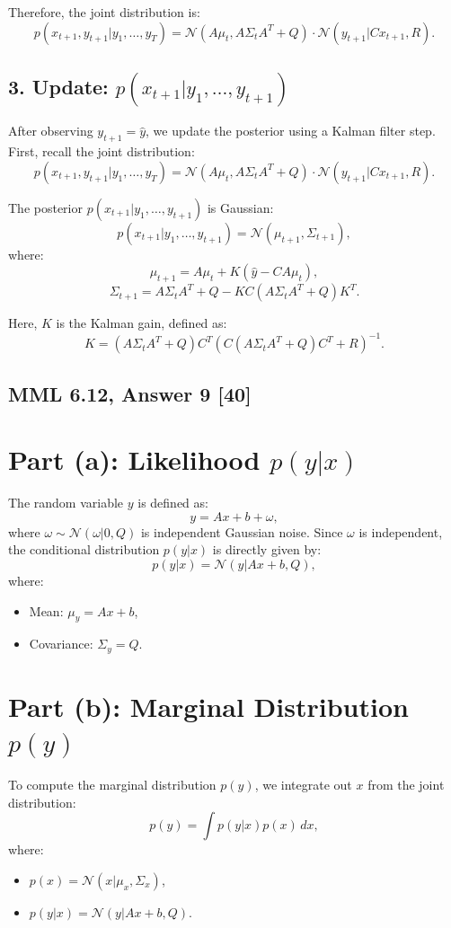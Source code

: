 \documentclass[12pt]{article}
\begin{document}
Therefore, the joint distribution is:
\[
p(x_{t+1}, y_{t+1} | y_1, \dots, y_T) = \mathcal{N}(A \mu_t, A \Sigma_t A^T + Q) \cdot \mathcal{N}(y_{t+1} | C x_{t+1}, R).
\]

\subsection*{3. Update: \( p(x_{t+1} | y_1, \dots, y_{t+1}) \)}

After observing \( y_{t+1} = \hat{y} \), we update the posterior using a Kalman filter step. First, recall the joint distribution:
\[
p(x_{t+1}, y_{t+1} | y_1, \dots, y_T) = \mathcal{N}(A \mu_t, A \Sigma_t A^T + Q) \cdot \mathcal{N}(y_{t+1} | C x_{t+1}, R).
\]

The posterior \( p(x_{t+1} | y_1, \dots, y_{t+1}) \) is Gaussian:
\[
p(x_{t+1} | y_1, \dots, y_{t+1}) = \mathcal{N}(\mu_{t+1}, \Sigma_{t+1}),
\]
where:
\[
\mu_{t+1} = A \mu_t + K (\hat{y} - C A \mu_t),
\]
\[
\Sigma_{t+1} = A \Sigma_t A^T + Q - K C (A \Sigma_t A^T + Q) K^T.
\]

Here, \( K \) is the Kalman gain, defined as:
\[
K = (A \Sigma_t A^T + Q) C^T \left( C (A \Sigma_t A^T + Q) C^T + R \right)^{-1}.
\]
\subsection*{MML 6.12, Answer 9 [40]}
\section*{Part (a): Likelihood \( p(y|x) \)}

The random variable \( y \) is defined as:
\[
y = A x + b + \omega,
\]
where \( \omega \sim \mathcal{N}(\omega | 0, Q) \) is independent Gaussian noise. Since \( \omega \) is independent, the conditional distribution \( p(y|x) \) is directly given by:
\[
p(y|x) = \mathcal{N}(y | A x + b, Q),
\]
where:
\begin{itemize}
    \item Mean: \( \mu_y = A x + b \),
    \item Covariance: \( \Sigma_y = Q \).
\end{itemize}

\section*{Part (b): Marginal Distribution \( p(y) \)}

To compute the marginal distribution \( p(y) \), we integrate out \( x \) from the joint distribution:
\[
p(y) = \int p(y|x) p(x) \, dx,
\]
where:
\begin{itemize}
    \item \( p(x) = \mathcal{N}(x | \mu_x, \Sigma_x) \),
    \item \( p(y|x) = \mathcal{N}(y | A x + b, Q) \).
\end{itemize}
\end{document}
